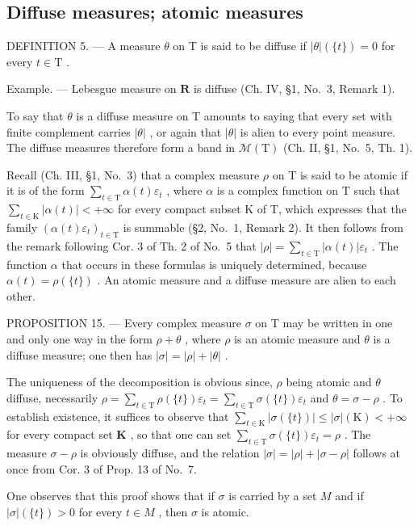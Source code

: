 \subsection{Diffuse measures; atomic measures}

DEFINITION 5. --- A measure \(\theta\) on T is said to be diffuse if \(|\theta|(\{t\}) = 0\) for every \(t \in \mathrm{T}\) .

Example. --- Lebesgue measure on \(\mathbf{R}\) is diffuse (Ch. IV, §1, No.~3, Remark 1).

To say that \(\theta\) is a diffuse measure on T amounts to saying that every set with finite complement carries \(|\theta|\) , or again that \(|\theta|\) is alien to every point measure. The diffuse measures therefore form a band in \(\mathcal{M}(\mathrm{T})\) (Ch. II, §1, No.~5, Th. 1).

Recall (Ch. III, §1, No.~3) that a complex measure \(\rho\) on T is said to be atomic if it is of the form \(\sum_{t\in \mathrm{T}}\alpha (t)\varepsilon_t\) , where \(\alpha\) is a complex function on T such that \(\sum_{t\in \mathrm{K}}|\alpha (t)| < +\infty\) for every compact subset K of T, which expresses that the family \(\left(\alpha (t)\varepsilon_t\right)_{t\in \mathrm{T}}\) is summable (§2, No.~1, Remark 2). It then follows from the remark following Cor. 3 of Th. 2 of No.~5 that \(|\rho| = \sum_{t\in \mathrm{T}}|\alpha (t)|\varepsilon_t\) . The function \(\alpha\) that occurs in these formulas is uniquely determined, because \(\alpha (t) = \rho (\{t\})\) . An atomic measure and a diffuse measure are alien to each other.

PROPOSITION 15. --- Every complex measure \(\sigma\) on T may be written in one and only one way in the form \(\rho + \theta\) , where \(\rho\) is an atomic measure and \(\theta\) is a diffuse measure; one then has \(|\sigma| = |\rho| + |\theta|\) .

The uniqueness of the decomposition is obvious since, \(\rho\) being atomic and \(\theta\) diffuse, necessarily \(\rho = \sum_{t\in \mathrm{T}}\rho (\{t\})\varepsilon_t = \sum_{t\in \mathrm{T}}\sigma (\{t\})\varepsilon_t\) and \(\theta = \sigma -\rho\) . To establish existence, it suffices to observe that \(\sum_{t\in \mathrm{K}}|\sigma (\{t\})| \leqslant |\sigma |(\mathrm{K}) < +\infty\) for every compact set \(\mathbf{K}\) , so that one can set \(\sum_{t\in \mathrm{T}}\sigma (\{t\})\varepsilon_t = \rho\) . The measure \(\sigma -\rho\) is obviously diffuse, and the relation \(|\sigma | = |\rho | + |\sigma -\rho |\) follows at once from Cor. 3 of Prop. 13 of No.~7.

One observes that this proof shows that if \(\sigma\) is carried by a set \(M\) and if \(|\sigma| (\{t\}) > 0\) for every \(t \in M\) , then \(\sigma\) is atomic.

